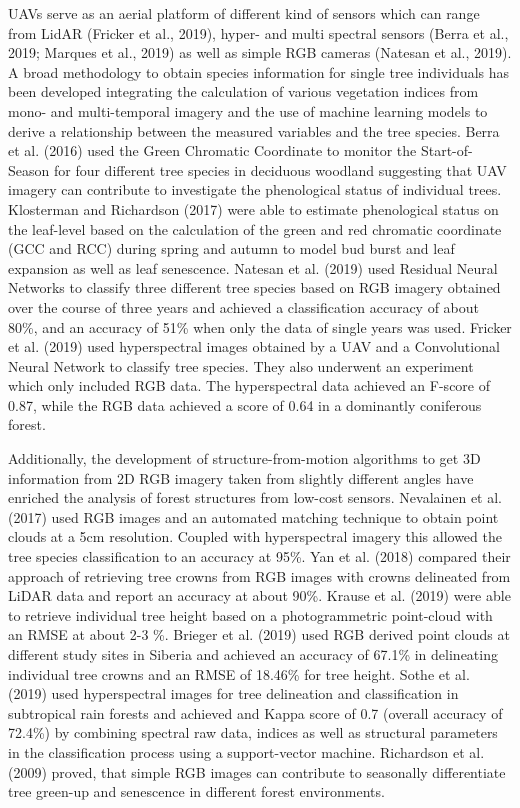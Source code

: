 \documentclass[]{article}
\begin{document}
UAVs serve as an aerial platform of different kind of sensors which can
range from LidAR (Fricker et al., 2019), hyper- and multi spectral
sensors (Berra et al., 2019; Marques et al., 2019) as well as simple RGB
cameras (Natesan et al., 2019). A broad methodology to obtain species
information for single tree individuals has been developed integrating
the calculation of various vegetation indices from mono- and
multi-temporal imagery and the use of machine learning models to derive
a relationship between the measured variables and the tree species.
Berra et al. (2016) used the Green Chromatic Coordinate to monitor the
Start-of-Season for four different tree species in deciduous woodland
suggesting that UAV imagery can contribute to investigate the
phenological status of individual trees. Klosterman and Richardson
(2017) were able to estimate phenological status on the leaf-level based
on the calculation of the green and red chromatic coordinate (GCC and
RCC) during spring and autumn to model bud burst and leaf expansion as
well as leaf senescence. Natesan et al. (2019) used Residual Neural
Networks to classify three different tree species based on RGB imagery
obtained over the course of three years and achieved a classification
accuracy of about 80\%, and an accuracy of 51\% when only the data of
single years was used. Fricker et al. (2019) used hyperspectral images
obtained by a UAV and a Convolutional Neural Network to classify tree
species. They also underwent an experiment which only included RGB data.
The hyperspectral data achieved an F-score of 0.87, while the RGB data
achieved a score of 0.64 in a dominantly coniferous forest.

Additionally, the development of structure-from-motion algorithms to get
3D information from 2D RGB imagery taken from slightly different angles
have enriched the analysis of forest structures from low-cost sensors.
Nevalainen et al. (2017) used RGB images and an automated matching
technique to obtain point clouds at a 5cm resolution. Coupled with
hyperspectral imagery this allowed the tree species classification to an
accuracy at 95\%. Yan et al. (2018) compared their approach of
retrieving tree crowns from RGB images with crowns delineated from LiDAR
data and report an accuracy at about 90\%. Krause et al. (2019) were
able to retrieve individual tree height based on a photogrammetric
point-cloud with an RMSE at about 2-3 \%. Brieger et al. (2019) used RGB
derived point clouds at different study sites in Siberia and achieved an
accuracy of 67.1\% in delineating individual tree crowns and an RMSE of
18.46\% for tree height. Sothe et al. (2019) used hyperspectral images
for tree delineation and classification in subtropical rain forests and
achieved and Kappa score of 0.7 (overall accuracy of 72.4\%) by
combining spectral raw data, indices as well as structural parameters in
the classification process using a support-vector machine. Richardson et
al. (2009) proved, that simple RGB images can contribute to seasonally
differentiate tree green-up and senescence in different forest
environments.
\end{document}
